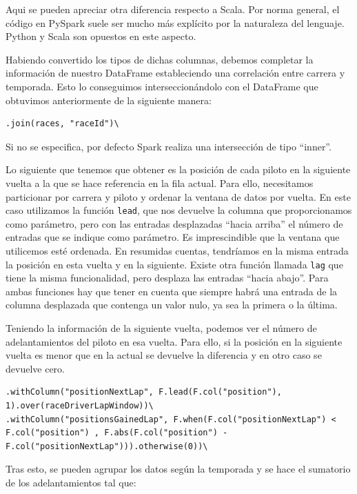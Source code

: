 \documentclass[12pt,twoside,titlepage]{report}
\newcommand{\quotes}[1]{``#1''}
\begin{document}
Aqui se pueden apreciar otra diferencia respecto a Scala. Por norma general, el código en PySpark suele ser mucho más explícito por la naturaleza del lenguaje. Python y Scala son opuestos en este aspecto. 

Habiendo convertido los tipos de dichas columnas, debemos completar la información de nuestro DataFrame estableciendo una correlación entre carrera y temporada. Esto lo conseguimos interseccionándolo con el DataFrame que obtuvimos anteriormente de la siguiente manera:

\begin{lstlisting}
.join(races, "raceId")\  
\end{lstlisting}

Si no se especifica, por defecto Spark realiza una intersección de tipo \quotes{inner}.

Lo siguiente que tenemos que obtener es la posición de cada piloto en la siguiente vuelta a la que se hace referencia en la fila actual. Para ello, necesitamos particionar por carrera y piloto y ordenar la ventana de datos por vuelta. En este caso utilizamos la función \texttt{lead}, que nos devuelve la columna que proporcionamos como parámetro, pero con las entradas desplazadas \quotes{hacia arriba} el número de entradas que se indique como parámetro. Es imprescindible que la ventana que utilicemos esté ordenada. En resumidas cuentas, tendríamos en la misma entrada la posición en esta vuelta y en la siguiente. Existe otra función llamada \texttt{lag} que tiene la misma funcionalidad, pero desplaza las entradas \quotes{hacia abajo}. Para ambas funciones hay que tener en cuenta que siempre habrá una entrada de la columna desplazada que contenga un valor nulo, ya sea la primera o la última.

Teniendo la información de la siguiente vuelta, podemos ver el número de adelantamientos del piloto en esa vuelta. Para ello, si la posición en la siguiente vuelta es menor que en la actual se devuelve la diferencia y en otro caso se devuelve cero.

\begin{lstlisting}
.withColumn("positionNextLap", F.lead(F.col("position"), 1).over(raceDriverLapWindow))\
.withColumn("positionsGainedLap", F.when(F.col("positionNextLap") < F.col("position") , F.abs(F.col("position") - F.col("positionNextLap"))).otherwise(0))\
\end{lstlisting}

Tras esto, se pueden agrupar los datos según la temporada y se hace el sumatorio de los adelantamientos tal que:
\end{document}
